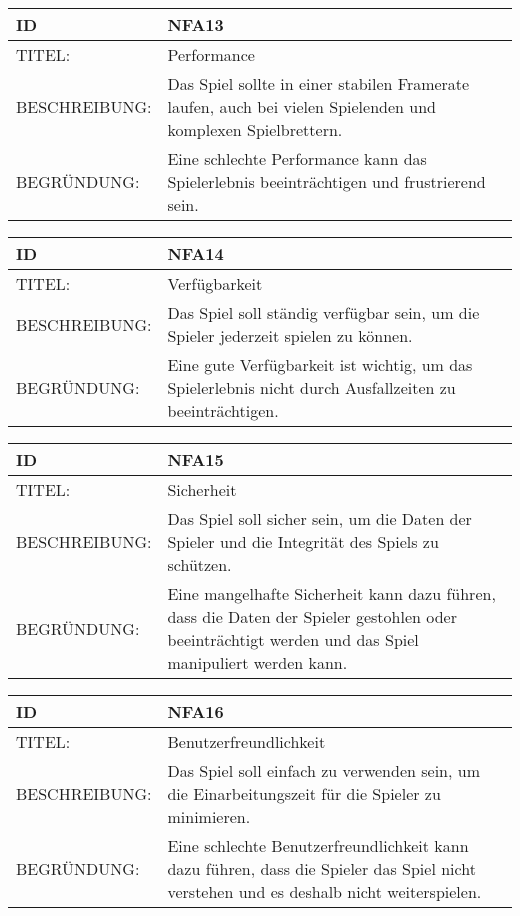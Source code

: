 \documentclass{uulm-assignment}
\begin{document}
     \begin{tabularx}{\textwidth}{|l|X |} \hline
        \textbf{ID} & \textbf{NFA13} \\
        \hline
        TITEL: & Performance \\
        \hline
        BESCHREIBUNG: &  Das Spiel sollte in einer stabilen Framerate laufen, auch bei vielen Spielenden und komplexen Spielbrettern. \\
        \hline
        BEGRÜNDUNG: & Eine schlechte Performance kann das Spielerlebnis beeinträchtigen und frustrierend sein. \\
        \hline
    \end{tabularx}
    
    \begin{tabularx}{\textwidth}{|l|X |} \hline
        \textbf{ID} & \textbf{NFA14} \\
        \hline
        TITEL: & Verfügbarkeit \\
        \hline
        BESCHREIBUNG: &  Das Spiel soll ständig verfügbar sein, um die Spieler jederzeit spielen zu können.  \\
        \hline
        BEGRÜNDUNG: &  Eine gute Verfügbarkeit ist wichtig, um das Spielerlebnis nicht durch Ausfallzeiten zu beeinträchtigen. \\
        \hline
    \end{tabularx}
    
    \begin{tabularx}{\textwidth}{|l|X |} \hline
        \textbf{ID} & \textbf{NFA15} \\
        \hline
        TITEL: & Sicherheit \\
        \hline
        BESCHREIBUNG: &   Das Spiel soll sicher sein, um die Daten der Spieler und die Integrität des Spiels zu schützen.  \\
        \hline
        BEGRÜNDUNG: & Eine mangelhafte Sicherheit kann dazu führen, dass die Daten der Spieler gestohlen oder beeinträchtigt werden und das Spiel manipuliert werden kann. \\
        \hline
    \end{tabularx}
    
    \begin{tabularx}{\textwidth}{|l|X |} \hline
        \textbf{ID} & \textbf{NFA16} \\
        \hline
        TITEL: & Benutzerfreundlichkeit \\
        \hline
        BESCHREIBUNG: &   Das Spiel soll einfach zu verwenden sein, um die Einarbeitungszeit für die Spieler zu minimieren.  \\
        \hline
        BEGRÜNDUNG: &  Eine schlechte Benutzerfreundlichkeit kann dazu führen, dass die Spieler das Spiel nicht verstehen und es deshalb nicht weiterspielen. \\
        \hline
    \end{tabularx}
    
\end{document}
